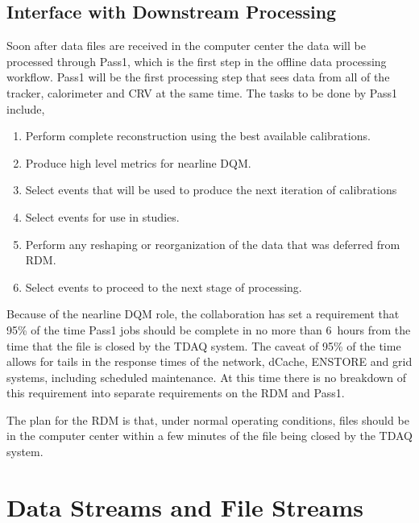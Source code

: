 \section{Interface with Downstream Processing}
\label{sec:downstreamProcessing}

Soon after data files are received in the computer center the data will be processed
through Pass1, which is the first step in the offline data processing workflow.
Pass1 will be the first processing step that sees data from all of the tracker,
calorimeter and CRV at the same time.  The tasks to be done by Pass1 include,
\begin{enumerate}
  \item Perform complete reconstruction using the best available calibrations.
  \item Produce high level metrics for nearline DQM.
  \item Select events that will be used to produce the next iteration of calibrations
  \item Select events for use in studies.
  \item Perform any reshaping or reorganization of the data that was deferred from RDM.
  \item Select events to proceed to the next stage of processing. 
\end{enumerate}

Because of the nearline DQM role, the collaboration has set a requirement that
95\% of the time Pass1 jobs should be complete in no more than 6~hours from the
time that the file is closed by the TDAQ system.
The caveat of 95\% of the time allows for tails in the response times of
the network, dCache, ENSTORE and grid systems, including scheduled maintenance.
At this time there is no breakdown of this requirement into separate requirements
on the RDM and Pass1.

The plan for the RDM is that, under normal operating conditions,
files should be in the computer center within a few minutes of the file being closed
by the TDAQ system.



\chapter{Data Streams and File Streams}
\label{ch:DataStreamsAndFileStreams}

